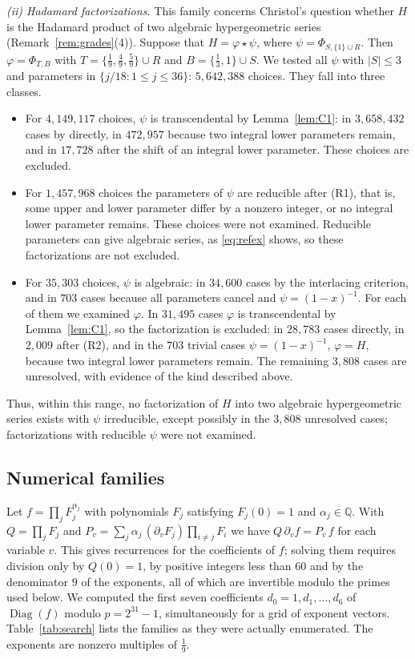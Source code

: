 \documentclass[11pt]{amsart}
\theoremstyle{definition}
\theoremstyle{remark}
\numberwithin{equation}{section}
\newcommand{\Q}{\mathbb{Q}}
\DeclareMathOperator{\Diag}{Diag}
\begin{document}
\emph{(ii) Hadamard factorizations.} This family concerns Christol's question whether $H$ is the Hadamard product of two algebraic hypergeometric series (Remark~\ref{rem:grades}(4)). Suppose that $H=\varphi\star\psi$, where $\psi=\Phi_{S,\{1\}\cup R}$. Then $\varphi=\Phi_{T,B}$ with $T=\{\frac19,\frac49,\frac59\}\cup R$ and $B=\{\frac13,1\}\cup S$. We tested all $\psi$ with $|S|\le3$ and parameters in $\{j/18:1\le j\le36\}$: $5{,}642{,}388$ choices. They fall into three classes.
\begin{itemize}[leftmargin=2em]
\item For $4{,}149{,}117$ choices, $\psi$ is transcendental by Lemma~\ref{lem:C1}: in $3{,}658{,}432$ cases by \citet[Theorem~4.8]{BeukersHeckman1989} directly, in $472{,}957$ because two integral lower parameters remain, and in $17{,}728$ after the shift of an integral lower parameter. These choices are excluded.
\item For $1{,}457{,}968$ choices the parameters of $\psi$ are reducible after (R1), that is, some upper and lower parameter differ by a nonzero integer, or no integral lower parameter remains. These choices were not examined. Reducible parameters can give algebraic series, as \eqref{eq:refex} shows, so these factorizations are not excluded.
\item For $35{,}303$ choices, $\psi$ is algebraic: in $34{,}600$ cases by the interlacing criterion, and in $703$ cases because all parameters cancel and $\psi=(1-x)^{-1}$. For each of them we examined $\varphi$. In $31{,}495$ cases $\varphi$ is transcendental by Lemma~\ref{lem:C1}, so the factorization is excluded: in $28{,}783$ cases directly, in $2{,}009$ after (R2), and in the $703$ trivial cases $\psi=(1-x)^{-1}$, $\varphi=H$, because two integral lower parameters remain. The remaining $3{,}808$ cases are unresolved, with evidence of the kind described above.
\end{itemize}
Thus, within this range, no factorization of $H$ into two algebraic hypergeometric series exists with $\psi$ irreducible, except possibly in the $3{,}808$ unresolved cases; factorizations with reducible $\psi$ were not examined.

\subsection*{Numerical families}
Let $f=\prod_jF_j^{\alpha_j}$ with polynomials $F_j$ satisfying $F_j(0)=1$ and $\alpha_j\in\Q$. With $Q=\prod_jF_j$ and $P_v=\sum_j\alpha_j\,(\partial_vF_j)\prod_{i\ne j}F_i$ we have $Q\,\partial_vf=P_v\,f$ for each variable $v$. This gives recurrences for the coefficients of $f$; solving them requires division only by $Q(0)=1$, by positive integers less than $60$ and by the denominator $9$ of the exponents, all of which are invertible modulo the primes used below. We computed the first seven coefficients $d_0=1,d_1,\dots,d_6$ of $\Diag(f)$ modulo $p=2^{31}-1$, simultaneously for a grid of exponent vectors. Table~\ref{tab:search} lists the families as they were actually enumerated. The exponents are nonzero multiples of $\frac19$.
\end{document}
